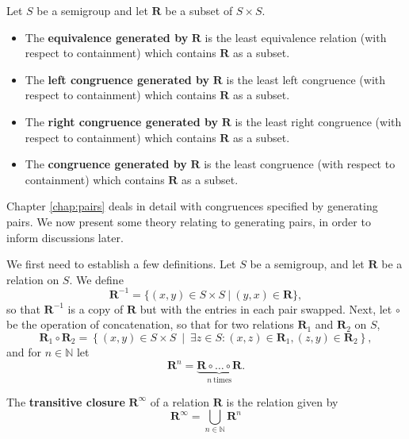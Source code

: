 \begin{definition}
  \label{def:gen-pairs}
  Let $S$ be a semigroup and let $\mathbf{R}$ be a subset of $S \times S$.
  \begin{itemize}
  \item The \textbf{equivalence generated by} $\mathbf{R}$ is the least
    equivalence relation (with respect to containment) which contains
    $\mathbf{R}$ as a subset.
  \item The \textbf{left congruence generated by} $\mathbf{R}$ is the least left
    congruence (with respect to containment) which contains $\mathbf{R}$ as a
    subset.
  \item The \textbf{right congruence generated by} $\mathbf{R}$ is the least
    right congruence (with respect to containment) which contains $\mathbf{R}$
    as a subset.
  \item The \textbf{congruence generated by} $\mathbf{R}$ is the least
    congruence (with respect to containment) which contains $\mathbf{R}$ as a
    subset.
  \end{itemize}
\end{definition}

Chapter \ref{chap:pairs} deals in detail with congruences specified by
generating pairs.  We now present some theory relating to generating pairs, in
order to inform discussions later.

We first need to establish a few definitions.  Let $S$ be a semigroup, and let
$\mathbf{R}$ be a relation on $S$.  We define
$$\mathbf{R}^{-1} = \{(x,y) \in S \times S ~|~ (y,x) \in \mathbf{R}\},$$
so that $\mathbf{R}^{-1}$ is a copy of $\mathbf{R}$ but with the entries in each
pair swapped. 
Next, let $\circ$ be the operation of concatenation, so that for two relations
$\mathbf{R}_1$ and $\mathbf{R}_2$ on $S$,
$$\mathbf{R}_1 \circ \mathbf{R}_2 = \left\{(x,y) \in S \times S ~\middle|~
  \exists z \in S: (x,z) \in \mathbf{R}_1, (z,y) \in \mathbf{R}_2\right\},$$
and for $n \in \mathbb{N}$ let
$$\mathbf{R}^n = \underbrace{\mathbf{R} \circ \dots \circ \mathbf{R}}_{n~\text{times}}.$$

\begin{definition}
  \label{def:transitiveclosure}
  The \textbf{transitive closure} $\mathbf{R}^\infty$ of a relation $\mathbf{R}$
  is the relation given by
  $$\mathbf{R}^\infty=\bigcup_{n \in \mathbb{N}}\mathbf{R}^n$$
\end{definition}

